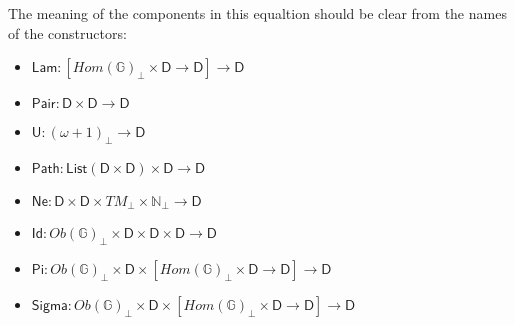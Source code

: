 \documentclass{amsart}
\theoremstyle{definition}
\theoremstyle{remark}
\newcommand{\D}{\mathsf{D}}
\newcommand{\bbG}{\mathbb{G}}
\newcommand{\nats}{\mathbb{N}}
\numberwithin{table}{section}
\begin{document}
The meaning of the components in this equaltion should be clear from the names of the constructors:
\begin{itemize}
\item[] $\mathsf{Lam} : [Hom(\bbG)_\bot \times \D \to \D] \to \D$
\item[] $\mathsf{Pair} : \D \times \D \to \D$
\item[] $\mathsf{U} : (\omega + 1)_\bot \to \D$
\item[] $\mathsf{Path} : \mathsf{List}(\D \times \D) \times \D \to \D$
\item[] $\mathsf{Ne} : \D \times \D \times TM_\bot \times \nats_\bot \to \D$
\item[] $\mathsf{Id} : Ob(\bbG)_\bot \times \D \times \D \times \D \to \D$
\item[] $\mathsf{Pi} : Ob(\bbG)_\bot \times \D \times [Hom(\bbG)_\bot \times \D \to \D] \to \D$
\item[] $\mathsf{Sigma} : Ob(\bbG)_\bot \times \D \times [Hom(\bbG)_\bot \times \D \to \D] \to \D$
\end{itemize}
\end{document}
